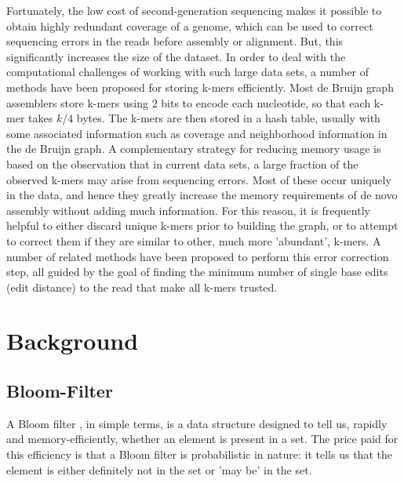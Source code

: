 \documentclass[11pt]{article}
\begin{document}
Fortunately, the low cost of second-generation sequencing makes it possible to obtain highly redundant coverage of a genome, which can be used to correct sequencing errors in the reads before assembly or alignment. But, this significantly increases the size of the dataset. In order to deal with the computational challenges of working with such large data sets, a number of methods have been proposed for storing k-mers efficiently. Most de Bruijn graph assemblers store k-mers using 2 bits to encode each nucleotide, so that each k-mer takes $k/4$ bytes. The k-mers are then stored in a hash table, usually with some associated information such as coverage and neighborhood information in the de Bruijn graph. A complementary strategy for reducing memory usage is based on the observation that in current data sets, a large fraction of the observed k-mers may arise from sequencing errors. Most of these occur uniquely in the data, and hence they greatly increase the memory requirements of de novo assembly without adding much information. For this reason, it is frequently helpful to either discard unique k-mers prior to building the graph, or to attempt to correct them if they are similar to other, much more 'abundant', k-mers. A number of related methods have been proposed to perform this error correction step, all guided by the goal of finding the minimum number of single base edits (edit distance) to the read that make all k-mers trusted.



\section{Background}

\subsection{Bloom-Filter}
A Bloom filter \cite{bloom}, in simple terms, is a data structure designed to tell us, rapidly and memory-efficiently, whether an element is present in a set. The price paid for this efficiency is that a Bloom filter is probabilistic in nature: it tells us that the element is either definitely not in the set or 'may be' in the set.
\end{document}
